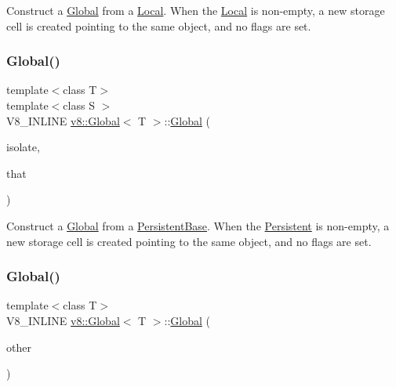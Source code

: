 Construct a \mbox{\hyperlink{classv8_1_1Global}{Global}} from a \mbox{\hyperlink{classv8_1_1Local}{Local}}. When the \mbox{\hyperlink{classv8_1_1Local}{Local}} is non-\/empty, a new storage cell is created pointing to the same object, and no flags are set. \mbox{\label{classv8_1_1Global_a6243ecb28bb97d066065796fa28f7415}} 
\subsubsection{\texorpdfstring{Global()}{Global()}\hspace{0.1cm}{\footnotesize\ttfamily [3/4]}}
{\footnotesize\ttfamily template$<$class T$>$ \\
template$<$class S $>$ \\
V8\+\_\+\+I\+N\+L\+I\+NE \mbox{\hyperlink{classv8_1_1Global}{v8\+::\+Global}}$<$ T $>$\+::\mbox{\hyperlink{classv8_1_1Global}{Global}} (\begin{DoxyParamCaption}\item[{Isolate $\ast$}]{isolate,  }\item[{const \mbox{\hyperlink{classv8_1_1PersistentBase}{Persistent\+Base}}$<$ S $>$ \&}]{that }\end{DoxyParamCaption})\hspace{0.3cm}{\ttfamily [inline]}}

Construct a \mbox{\hyperlink{classv8_1_1Global}{Global}} from a \mbox{\hyperlink{classv8_1_1PersistentBase}{Persistent\+Base}}. When the \mbox{\hyperlink{classv8_1_1Persistent}{Persistent}} is non-\/empty, a new storage cell is created pointing to the same object, and no flags are set. \mbox{\label{classv8_1_1Global_ab8f3c754a58146e6db67012cd74a49cb}} 
\subsubsection{\texorpdfstring{Global()}{Global()}\hspace{0.1cm}{\footnotesize\ttfamily [4/4]}}
{\footnotesize\ttfamily template$<$class T$>$ \\
V8\+\_\+\+I\+N\+L\+I\+NE \mbox{\hyperlink{classv8_1_1Global}{v8\+::\+Global}}$<$ T $>$\+::\mbox{\hyperlink{classv8_1_1Global}{Global}} (\begin{DoxyParamCaption}\item[{\mbox{\hyperlink{classv8_1_1Global}{Global}}$<$ T $>$ \&\&}]{other }\end{DoxyParamCaption})\hspace{0.3cm}{\ttfamily [inline]}}


